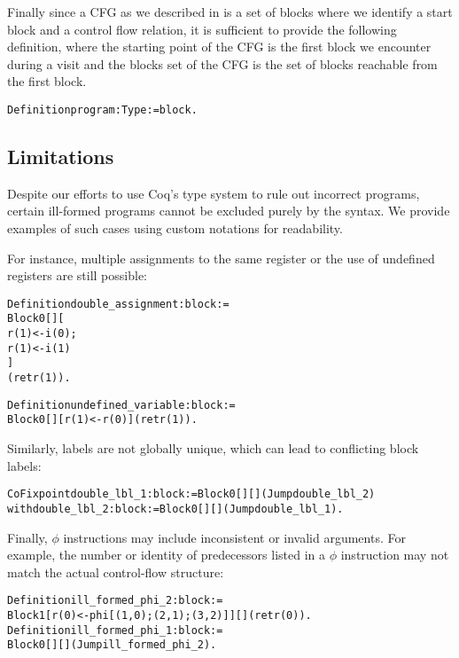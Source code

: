 Finally since a CFG as we described in  is a set of blocks where we identify a start block and a control flow relation, it is sufficient to provide the following definition, where the starting point of the CFG is the first block we encounter during a visit and the blocks set of the CFG is the set of blocks reachable from the first block.

\begin{alltt}
Definition program : Type := block.
\end{alltt}

\subsection{Limitations}
\label{subsec:limitations}

Despite our efforts to use Coq's type system to rule out incorrect programs, certain ill-formed programs cannot be excluded purely by the syntax. We provide examples of such cases using custom notations for readability.

For instance, multiple assignments to the same register or the use of undefined registers are still possible:

\begin{alltt}
Definition double_assignment : block :=
  Block 0 [] [
    r(1) <- i(0);
    r(1) <- i(1)
  ]
  (ret r(1)).

Definition undefined_variable : block :=
  Block 0 [] [r(1) <- r(0)] (ret r(1)).
\end{alltt}

Similarly, labels are not globally unique, which can lead to conflicting block labels:

\begin{alltt}
CoFixpoint double_lbl_1 : block := Block 0 [] [] (Jump double_lbl_2)
  with double_lbl_2 : block := Block 0 [] [] (Jump double_lbl_1).
\end{alltt}

Finally, $\phi$ instructions may include inconsistent or invalid arguments. For example, the number or identity of predecessors listed in a $\phi$ instruction may not match the actual control-flow structure:

\begin{alltt}
Definition ill_formed_phi_2 : block :=
  Block 1 [r(0) <- phi [(1, 0); (2, 1); (3, 2)]] [] (ret r(0)).
Definition ill_formed_phi_1 : block :=
  Block 0 [] [] (Jump ill_formed_phi_2).
\end{alltt}

